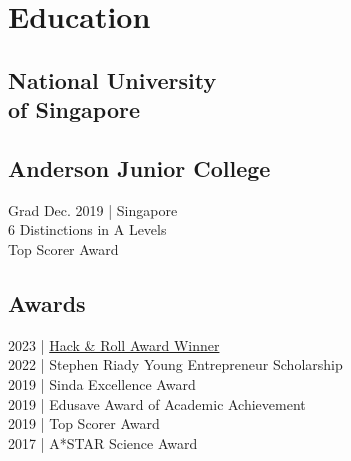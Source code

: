 \documentclass[]{deedy-resume-openfont}
\begin{document}
%
%
\lastupdated

%
%

%
%

\begin{minipage}[t]{0.33\textwidth} 


\section{Education} 

\subsection{National University \\ of Singapore}
\subtitle{University Scholars Programme}
\subtitle{NUS College Honours Programme}
\subtitle{Stephen Riady Young Entrepreneur Scholar}
\sectionsep

\subsection{Anderson Junior College}
Grad Dec. 2019 | Singapore\\
6 Distinctions in A Levels\\
Top Scorer Award
\sectionsep

\subsection{Awards}
2023 | \href{https://github.com/g-tejas/Changuage}{Hack \& Roll Award Winner}\\
2022 | Stephen Riady Young Entrepreneur Scholarship\\
2019 | Sinda Excellence Award\\
2019 | Edusave Award of Academic Achievement\\
2019 | Top Scorer Award\\
2017 | A*STAR Science Award
\sectionsep


\end{minipage}
\end{document}
